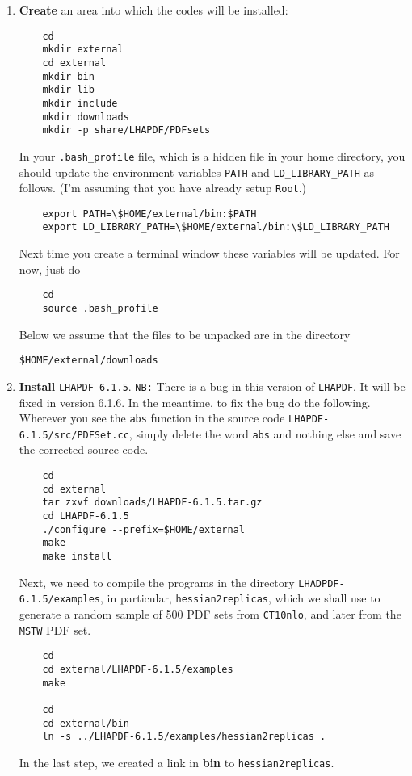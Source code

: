 \documentclass[aps,prd,preprint,nofootinbib]{revtex4}
\begin{document}
\begin{enumerate}
\item
{\bf Create} an area into which the codes will be installed:
	\begin{verbatim}
	cd
	mkdir external
	cd external
	mkdir bin
	mkdir lib
	mkdir include
	mkdir downloads
	mkdir -p share/LHAPDF/PDFsets
	\end{verbatim}
In your {\tt .bash\_profile} file, which is a hidden file in your home directory, you should update the environment variables {\tt PATH} and {\tt LD\_LIBRARY\_PATH} 
as follows. (I'm assuming that you have already setup {\tt Root}.)
	\begin{verbatim}
	export PATH=\$HOME/external/bin:$PATH
	export LD_LIBRARY_PATH=\$HOME/external/bin:\$LD_LIBRARY_PATH
	\end{verbatim}

Next time you create a terminal window these variables will be updated. For now, just do
	\begin{verbatim}
	cd 
	source .bash_profile
	\end{verbatim}

Below we assume that the files to be unpacked are in the directory 

{\tt \$HOME/external/downloads}

\item {\bf Install} {\tt LHAPDF-6.1.5}.  {\tt NB:} There is a bug in this version of {\tt LHAPDF}. It will be
fixed in version 6.1.6. In the meantime, to fix
the bug do the following. Wherever
you see the {\tt abs} function in the source code {\tt LHAPDF-6.1.5/src/PDFSet.cc}, simply 
delete the word {\tt abs} and nothing else and save the corrected source code. 
	\begin{verbatim}
	cd 
	cd external
	tar zxvf downloads/LHAPDF-6.1.5.tar.gz
	cd LHAPDF-6.1.5
	./configure --prefix=$HOME/external
	make
	make install
	\end{verbatim}
Next, we need to compile the programs in the directory {\tt LHADPDF-6.1.5/examples}, in 
particular, {\tt hessian2replicas}, which we shall use to generate a random sample of 500 PDF sets
from {\tt CT10nlo}, and later from the {\tt MSTW} PDF set.
	\begin{verbatim}
	cd 
	cd external/LHAPDF-6.1.5/examples
	make
	
	cd 
	cd external/bin
	ln -s ../LHAPDF-6.1.5/examples/hessian2replicas .
	\end{verbatim}
In the last step, we created a link in {\bf bin} to {\tt hessian2replicas}.
\smallskip


\end{enumerate}
\end{document}
